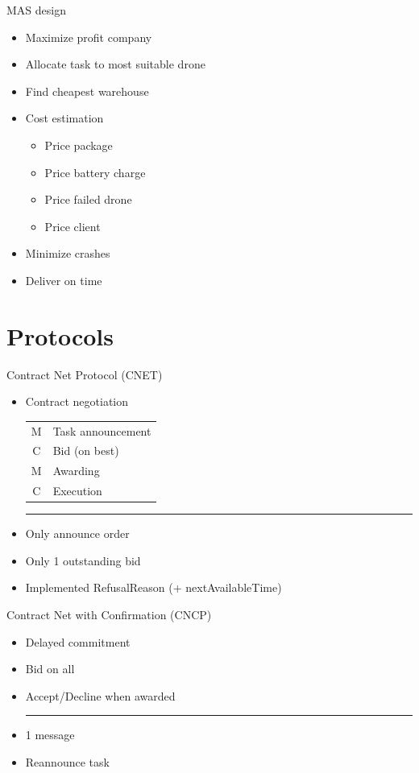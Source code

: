 \documentclass[notes]{beamer}
\newcommand{\seperation}{\vspace{0.5cm}\hrule\vspace{0.5cm}}
\begin{document}
	\begin{frame}{MAS design}
		\begin{itemize}
			\item Maximize profit company
			\item Allocate task to most suitable drone
			\item Find cheapest warehouse
			\item Cost estimation
				\begin{itemize}
				\item Price package
				\item Price battery charge
				\item Price failed drone
				\item Price client
				\end{itemize}
			\item Minimize crashes
			\item Deliver on time
		\end{itemize}
	\end{frame}

	\section{Protocols}
	\begin{frame}{Contract Net Protocol (CNET)}
		\begin{itemize}
			\item Contract negotiation
			\linebreak
			\begin{tabular}{cl}
				M & Task announcement \\
				C & Bid (on best) \\
				M & Awarding \\
				C & Execution \\
			\end{tabular}
			\seperation
			\item Only announce order
			\item Only 1 outstanding bid
			\item Implemented RefusalReason (+ nextAvailableTime)
		\end{itemize}
	\end{frame}

	\begin{frame}{Contract Net with Confirmation (CNCP)}
		\begin{itemize}
			\item Delayed commitment
			\item Bid on all
			\item Accept/Decline when awarded
			\seperation
			\item 1 message
			\item Reannounce task
		\end{itemize}
	\end{frame}
\end{document}
